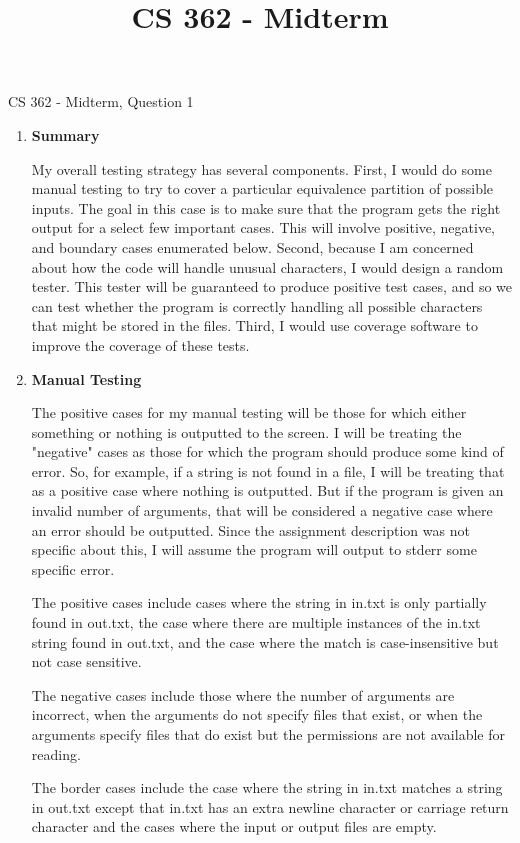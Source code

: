 \documentclass[11pt,letterpaper]{article}
\begin{document}
 \univlogo

\title{CS 362 - Midterm}
{\Huge CS 362 - Midterm, Question 1}\\[5mm]
\begin{enumerate}[label=\arabic*.]
  \item \textbf{Summary}

    My overall testing strategy has several components. First, I would do
    some manual testing to try to cover a particular equivalence partition
    of possible inputs. The goal in this case is to make sure that the
    program gets the right output for a select few important cases.
    This will involve positive, negative, and boundary cases enumerated
    below. 
    Second, because I am concerned about how the code will handle unusual
    characters, I would design a random tester. This tester will be 
    guaranteed to produce positive test cases, and so we can test whether
    the program is correctly handling all possible characters that might
    be stored in the files. Third, I would use coverage software to
    improve the coverage of these tests. 

  \item \textbf{Manual Testing}

    The positive cases for my manual testing will be those for which either
    something or nothing is outputted to the screen. I will be treating
    the "negative" cases as those for which the program should produce
    some kind of error. So, for example, if a string is not found in a file,
    I will be treating that as a positive case where nothing is outputted.
    But if the program is given an invalid number of arguments, that will
    be considered a negative case where an error should be outputted. Since
    the assignment description was not specific about this, I will assume
    the program will output to stderr some specific error. 

    The positive cases include cases where the string in in.txt is  
    only partially found in out.txt, the case where there are multiple 
    instances of the in.txt string found in out.txt, and the case where
    the match is case-insensitive but not case sensitive.
    
    The negative cases include those where the number of arguments are incorrect, when the
    arguments do not specify files that exist, or when the arguments specify files that
    do exist but the permissions are not available for reading. 

    The border cases include the case where the string in in.txt matches
    a string in out.txt except that in.txt has an extra newline character
    or carriage return character and the cases where the input or output
    files are empty. 


\end{enumerate}
\end{document}
